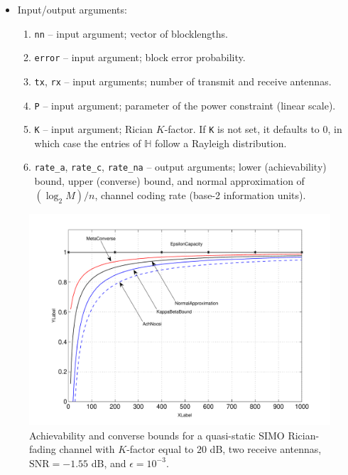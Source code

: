 \documentclass[a4paper,11p]{memoir}
\begin{document}
\begin{itemize}
\item Input/output arguments:
\begin{enumerate}
\item \verb|nn| -- input argument; vector of blocklengths.
\item \verb|error| -- input argument; block error probability.
\item \verb|tx|, \verb|rx| -- input arguments; number of transmit and receive antennas.
\item \verb|P| -- input argument; parameter of the power constraint (linear scale).
\item \verb|K| -- input argument; Rician $K$-factor. If \verb|K| is not set, it defaults to $0$, in which case the entries of $\mathbb{H}$ follow a Rayleigh distribution.
\item \verb|rate_a|, \verb|rate_c|, \verb|rate_na| -- output arguments; lower (achievability) bound, upper (converse) bound, and normal approximation of  $(\log_2 M)/n$, channel coding rate (base-2 information units).
\end{enumerate}

\end{itemize}


\begin{figure}[t]
	\centering
	\includegraphics[scale=0.5]{plots/quasi-static-simo.pdf}
\vspace{-1.5mm}
\caption{Achievability and converse bounds for a quasi-static SIMO Rician-fading channel with $K$-factor equal to $20$ dB, two receive antennas, $\text{SNR}=-1.55 $ dB, and $\epsilon=10^{-3}$. 
\label{fig:bounds-simo}}
\end{figure}
\end{document}
